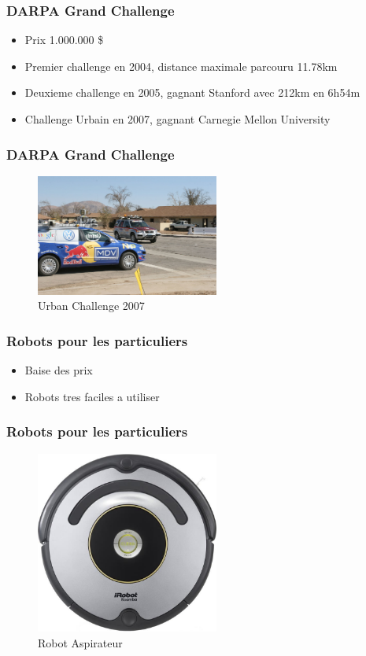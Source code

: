 \documentclass{beamer}
\begin{document}
\begin{frame}
\frametitle{DARPA Grand Challenge}
\begin{itemize}
      \item Prix 1.000.000 \$
      \item Premier challenge en 2004, distance maximale parcouru 11.78km 
      \item Deuxieme challenge en 2005, gagnant Stanford avec 212km en 6h54m 
      \item Challenge Urbain en 2007, gagnant Carnegie Mellon University
  \end{itemize}
\end{frame}

\begin{frame}
  \frametitle{DARPA Grand Challenge}
  \begin{figure}[!h]
  \centering
  \includegraphics[width=6cm]{1280px-UrbanChallenge_StandfordRacingandVictorTango.jpg}
  \caption{Urban Challenge 2007}
  \end{figure}
\end{frame}

\begin{frame}
\frametitle{Robots pour les particuliers}
\begin{itemize}
      \item Baise des prix
      \item Robots tres faciles a utiliser 
  \end{itemize}
\end{frame}

\begin{frame}
  \frametitle{Robots pour les particuliers}
  \begin{figure}[!h]
  \centering
  \includegraphics[width=6cm]{irobot-roomba-615-aspirateur-robot-33w-61-db.jpg}
  \caption{Robot Aspirateur}
  \end{figure}
\end{frame}
\end{document}
